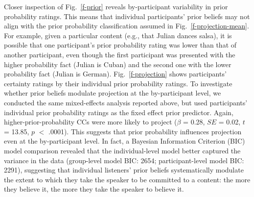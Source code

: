 \documentclass[11pt,fleqn]{article}
\newcommand{\figref}[1]{Fig.~\ref{#1}}
\newcommand{\6}{\mbox{$[\hspace*{-.6mm}[$}}
\newcommand{\9}{\mbox{$]\hspace*{-.6mm}]$}}
\begin{document}
Closer inspection of  \figref{f-prior} reveals by-participant variability in prior probability ratings. This means that individual participants' prior beliefs may not align with the prior probability classification assumed in  \figref{f-projection-mean}. For example, given a particular content (e.g., that Julian dances salsa), it is possible that one participant's prior probability rating was lower than that of another participant, even though the first participant was presented with the higher probability fact (Julian is Cuban) and the second one with the lower probability fact (Julian is German). \figref{f-projection} shows participants' certainty ratings by their individual prior probability ratings. %
To investigate whether prior beliefs modulate projection at the by-participant level,  we conducted the same mixed-effects analysis reported above, but used participants' individual prior probability ratings as the fixed effect prior predictor. Again, higher-prior-probability CCs were more likely to project ($\beta$ = 0.28, $SE$ = 0.02, $t$ = 13.85, $p$ $<$ .0001). This  suggests that prior probability influences projection even at the by-participant level. In fact, a Bayesian Information Criterion (BIC) model comparison  revealed that the individual-level model better captured the variance in the data (group-level model BIC: 2654; participant-level model BIC: 2291), suggesting that individual listeners' prior beliefs systematically modulate the extent to which they take the speaker to be committed to a content: the more they believe it, the more they take the speaker to believe it.
\end{document}
